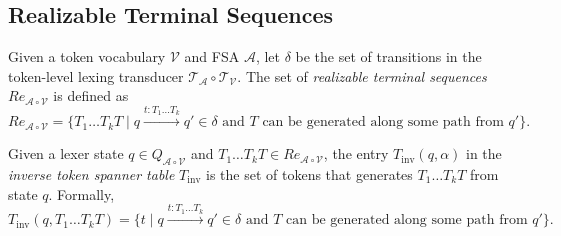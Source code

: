 \subsection{Realizable Terminal Sequences}
\begin{definition}
    \label{def:RealizableTerminalSequence}
    \leanok
    Given a token vocabulary $\mathcal{V}$ and FSA $\mathcal{A}$, let $\delta$ be the set of transitions in the token-level lexing transducer $\mathcal{T}_{\mathcal{A}} \circ \mathcal{T}_{\mathcal{V}}$. The set of \textit{realizable terminal sequences} $Re_{\mathcal{A} \circ \mathcal{V}}$ is defined as
    \[
    Re_{\mathcal{A} \circ \mathcal{V}} = \{ T_1 \ldots T_k T \mid q \xrightarrow{t:T_1 \ldots T_k} q' \in \delta \text{ and } T \text{ can be generated along some path from } q' \}.
    \]
\end{definition}

\begin{definition}
    \label{def:InverseTokenSpannerTable}
    \leanok 
    Given a lexer state $q \in Q_{\mathcal{A} \circ \mathcal{V}}$ and $T_1 \ldots T_k T \in Re_{\mathcal{A} \circ \mathcal{V}}$, the entry $T_{\text{inv}}(q, \alpha)$ in the \textit{inverse token spanner table} $T_{\text{inv}}$ is the set of tokens that generates $T_1 \ldots T_k T$ from state $q$. Formally,
    \[
    T_{\text{inv}}(q, T_1 \ldots T_k T) = \{ t \mid q \xrightarrow{t:T_1 \ldots T_k} q' \in \delta \text{ and } T \text{ can be generated along some path from } q' \}.
    \]
\end{definition}

